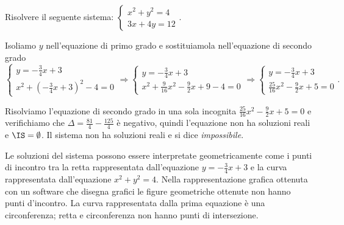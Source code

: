 \begin{esempio}
Risolvere il seguente sistema: \(\left\{\begin{array}{l}x^2+y^2=4 
\\3x+4y=12\end{array}\right..\)

Isoliamo \(y\) nell'equazione di primo grado e sostituiamola nell'equazione di 
secondo grado 
\[\left\{\begin{array}{l}y=-\frac 3 4x+3 \\
x^2+\left(-\frac 3 4x+3\right)^2-4=0\end{array}\right. 
\Rightarrow\left\{\begin{array}{l}y=-\frac 3 4x+3 \\
x^2+\frac 9{16}x^2-\frac 9 2x+9-4=0\end{array}\right. 
\Rightarrow\left\{\begin{array}{l}y=-\frac 3 4x+3 \\
\frac{25}{16}x^2-\frac{9}{2}x+5=0\end{array}\right..\]

Risolviamo l'equazione di secondo grado in una sola incognita 
\(\frac{25}{16}x^2-\frac 9 2x+5=0\) e verifichiamo che \(\Delta =\frac{81} 
4-\frac{125} 4\) è negativo, quindi l'equazione non ha soluzioni reali e 
\(\IS=\emptyset \). Il sistema non ha soluzioni reali e si dice 
\emph{impossibile}.

\begin{multicols}{2}
Le soluzioni del sistema possono essere interpretate geometricamente come i 
punti di incontro tra la retta rappresentata dall'equazione \(y=-\frac 3 4x+3\) e 
la curva rappresentata dall'equazione \(x^2+y^2=4\). Nella rappresentazione 
grafica ottenuta con un software che disegna grafici le figure geometriche 
ottenute non hanno punti d'incontro.
La curva rappresentata dalla prima equazione è una circonferenza; retta e 
circonferenza non hanno punti di intersezione.
\begin{center}

\end{center}
 \end{multicols}
\end{esempio}


